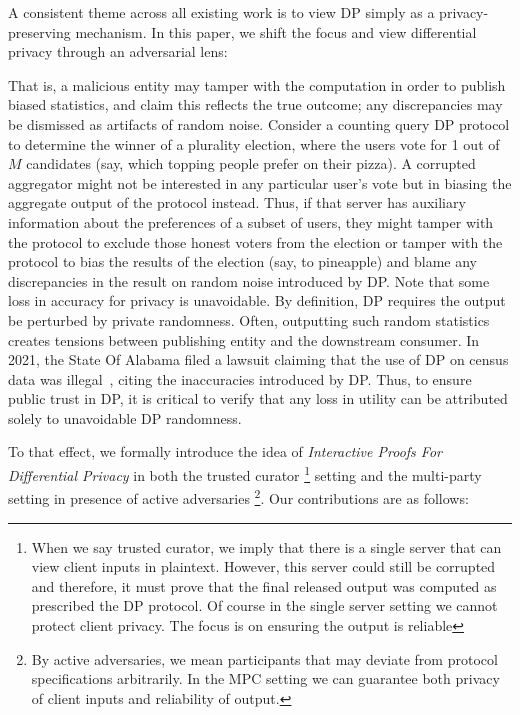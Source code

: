 A consistent theme across all existing work is to view DP simply as a
privacy-preserving mechanism.  In this paper, we shift the focus and
view differential privacy through an adversarial lens: 

That is, a malicious entity may tamper with the computation in order
to publish biased statistics, and claim this reflects the true
outcome; any discrepancies may be dismissed as artifacts of random
noise.  Consider a counting query DP protocol to determine the winner
of a plurality election, where the users vote for 1 out of $M$
candidates (say, which topping people prefer on their pizza).  A
corrupted aggregator might not be interested in any particular user's
vote but in biasing the aggregate output of the protocol instead.
Thus, if that server has auxiliary information about the preferences
of a subset of users, they might tamper with the protocol to exclude
those honest voters from the election or tamper with the protocol to
bias the results of the election (say, to pineapple) and blame any
discrepancies in the result on random noise introduced by DP.  Note
that some loss in accuracy for privacy is unavoidable.  By definition,
DP requires the output be perturbed by private randomness.  Often,
outputting such random statistics creates tensions between publishing
entity and the downstream consumer.  In 2021, the State Of Alabama
filed a lawsuit claiming that the use of DP on census data was
illegal~\cite{courtCase}, citing the inaccuracies introduced by DP.
Thus, to ensure public trust in DP, it is critical to verify that any
loss in utility can be attributed solely to unavoidable DP randomness.

To that effect, we formally introduce the idea of
\textit{Interactive Proofs For 
  Differential Privacy} in both the trusted curator \footnote{When we say trusted curator, we imply that there is a single server that can view client inputs in plaintext. However, this server could still be corrupted and therefore, it must prove that the final released output was computed as prescribed the DP protocol. Of course in the single server setting we cannot protect client privacy. The focus is on ensuring the output is reliable}  setting and the multi-party setting in presence of active adversaries
  \footnote{By active adversaries, we mean participants that may deviate from protocol specifications arbitrarily. In the MPC setting we can guarantee both privacy of client inputs and reliability of output.}. Our contributions are as
follows:

